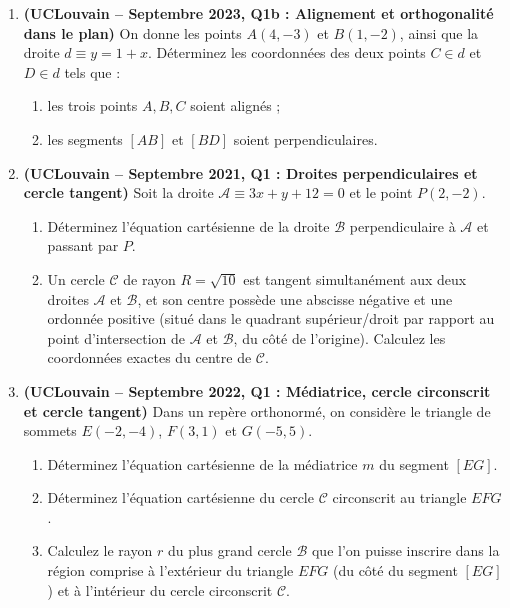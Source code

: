 \begin{enumerate}[label=\textbf{Exercice 6.\arabic* --}, align=left, leftmargin=*]

    \item \textbf{(UCLouvain -- Septembre 2023, Q1b : Alignement et orthogonalité dans le plan)}
    On donne les points $A(4, -3)$ et $B(1, -2)$, ainsi que la droite $d \equiv y = 1 + x$. Déterminez les coordonnées des deux points $C \in d$ et $D \in d$ tels que :
    \begin{enumerate}[label=(\alph*)]
        \item les trois points $A, B, C$ soient alignés ;
        \item les segments $[AB]$ et $[BD]$ soient perpendiculaires.
    \end{enumerate}

    \item \textbf{(UCLouvain -- Septembre 2021, Q1 : Droites perpendiculaires et cercle tangent)}
    Soit la droite $\mathcal{A} \equiv 3x + y + 12 = 0$ et le point $P(2, -2)$.
    \begin{enumerate}[label=(\alph*)]
        \item Déterminez l'équation cartésienne de la droite $\mathcal{B}$ perpendiculaire à $\mathcal{A}$ et passant par $P$.
        \item Un cercle $\mathcal{C}$ de rayon $R = \sqrt{10}$ est tangent simultanément aux deux droites $\mathcal{A}$ et $\mathcal{B}$, et son centre possède une abscisse négative et une ordonnée positive (situé dans le quadrant supérieur/droit par rapport au point d'intersection de $\mathcal{A}$ et $\mathcal{B}$, du côté de l'origine). Calculez les coordonnées exactes du centre de $\mathcal{C}$.
    \end{enumerate}

    \item \textbf{(UCLouvain -- Septembre 2022, Q1 : Médiatrice, cercle circonscrit et cercle tangent)}
    Dans un repère orthonormé, on considère le triangle de sommets $E(-2, -4)$, $F(3, 1)$ et $G(-5, 5)$.
    \begin{enumerate}[label=(\alph*)]
        \item Déterminez l'équation cartésienne de la médiatrice $m$ du segment $[EG]$.
        \item Déterminez l'équation cartésienne du cercle $\mathcal{C}$ circonscrit au triangle $EFG$.
        \item Calculez le rayon $r$ du plus grand cercle $\mathcal{B}$ que l'on puisse inscrire dans la région comprise à l'extérieur du triangle $EFG$ (du côté du segment $[EG]$) et à l'intérieur du cercle circonscrit $\mathcal{C}$.
    \end{enumerate}


\end{enumerate}
